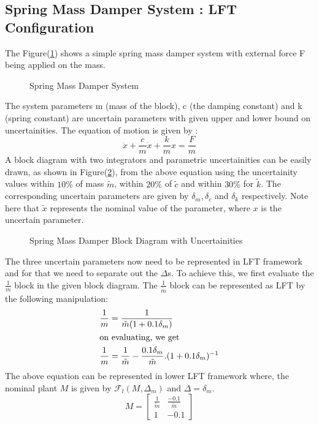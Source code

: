 \documentclass[a4paper,12pt]{article}
\begin{document}
			\subsection{Spring Mass Damper System : LFT Configuration} The Figure(\ref{smd}) shows a simple spring mass damper system with external force F being applied on the mass.
			\begin{figure}[H]
 
			  \centering
			  
			  
			  \caption{Spring Mass Damper System}
			 \label{smd}
		\end{figure} The system parameters m (mass of the block), c (the damping constant) and k (spring constant) are uncertain parameters with given upper and lower bound on uncertainities. The equation of motion is given by :
				\begin{equation}
					\ddot{x} + \frac{c}{m}\dot{x}+\frac{k}{m}x = \frac{F}{m}
				\end{equation}
				A block diagram with two integrators and parametric uncertainities can be easily drawn, as shown in Figure(\ref{smd2}), from the above equation using the uncertainity values within $10\%$ of mass $\tilde{m}$, within $20\%$ of $\tilde{c}$ and within $30\%$ for $\tilde{k}$. The corresponding uncertain parameters are given by $\delta_{m},\delta_{c}$ and $\delta_{k}$ respectively. Note here that $\tilde{x}$ represents the nominal value of the parameter, where $x$ is the uncertain parameter. 

			\begin{figure}[H]
 
			  \centering
			  
			  
			  \caption{Spring Mass Damper Block Diagram with Uncertainities}
			 \label{smd2}
		\end{figure}				
				The three uncertain parameters now need to be represented in LFT framework and for that we need to separate out the $\Delta$s. To achieve this, we first evaluate the $\frac{1}{m}$ block in the given block diagram. The $\frac{1}{\tilde{m}}$ block can be represented as LFT by the following manipulation:
				\begin{align}
					\frac{1}{m} &= \frac{1}{\tilde{m}(1+0.1\delta_{m})}\\
					\intertext{on evaluating, we get}
					\frac{1}{m} &= \frac{1}{\tilde{m}} - \frac{0.1\delta_{m}}{\tilde{m}}. (1+0.1\delta_{m})^{-1}
				\end{align}
				The above equation can be represented in lower LFT framework where, the nominal plant $M$ is given by $\mathscr{F}_{l}(M,\Delta_{m})$ and $\Delta = \delta_{m}$.
				\[M=
				\begin{bmatrix}
					\frac{1}{\tilde{m}} & \frac{-0.1}{\tilde{m}} \\
					1 & -0.1
				\end{bmatrix}
				\]
				
\end{document}
